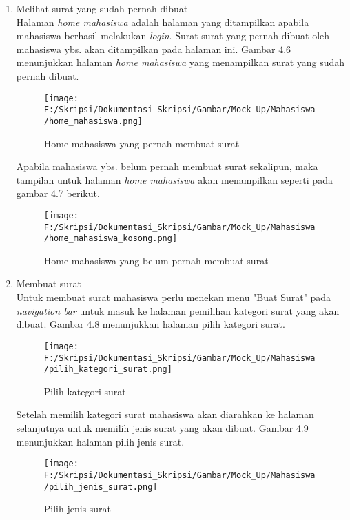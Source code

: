 \begin{enumerate}
	\item Melihat surat yang sudah pernah dibuat\\
	Halaman \textit{home mahasiswa} adalah halaman yang ditampilkan apabila mahasiswa berhasil melakukan \textit{login}. Surat-surat yang pernah dibuat oleh mahasiswa ybs. akan ditampilkan pada halaman ini. Gambar \hyperlink{home_mahasiswa_yang_pernah_membuat_surat}{4.6} menunjukkan halaman \textit{home mahasiswa} yang menampilkan surat yang sudah pernah dibuat.

	\begin{figure}[H]
	\centering
		\texttt{[image: F:/Skripsi/Dokumentasi\_Skripsi/Gambar/Mock\_Up/Mahasiswa/home\_mahasiswa.png]}
		\caption{Home mahasiswa yang pernah membuat surat}
		\label{fig:home_mahasiswa_yang_pernah_membuat_surat}
	\end{figure}
	
	Apabila mahasiswa ybs. belum pernah membuat surat sekalipun, maka tampilan untuk halaman \textit{home mahasiswa} akan menampilkan seperti pada gambar \hyperlink{home_mahasiswa_yang_belum_pernah_membuat_surat}{4.7} berikut.
	\begin{figure}[H]
	\centering
		\texttt{[image: F:/Skripsi/Dokumentasi\_Skripsi/Gambar/Mock\_Up/Mahasiswa/home\_mahasiswa\_kosong.png]}
		\caption{Home mahasiswa yang belum pernah membuat surat}
		\label{fig:home_mahasiswa_yang_belum_pernah_membuat_surat}
	\end{figure}
	
	\item Membuat surat\\
	Untuk membuat surat mahasiswa perlu menekan menu "Buat Surat" pada \textit{navigation bar} untuk masuk ke halaman pemilihan kategori surat yang akan dibuat. Gambar \hyperlink{pilih_kategori_surat}{4.8} menunjukkan halaman pilih kategori surat.
	\begin{figure}[H]
	\centering
		\texttt{[image: F:/Skripsi/Dokumentasi\_Skripsi/Gambar/Mock\_Up/Mahasiswa/pilih\_kategori\_surat.png]}
		\caption{Pilih kategori surat}
		\label{fig:pilih_kategori_surat}
	\end{figure}
	
	Setelah memilih kategori surat mahasiswa akan diarahkan ke halaman selanjutnya untuk memilih jenis surat yang akan dibuat. Gambar \hyperlink{pilih_jenis_surat}{4.9} menunjukkan halaman pilih jenis surat.
	\begin{figure}[H]
	\centering
		\texttt{[image: F:/Skripsi/Dokumentasi\_Skripsi/Gambar/Mock\_Up/Mahasiswa/pilih\_jenis\_surat.png]}
		\caption{Pilih jenis surat}
		\label{fig:pilih_jenis_surat}
	\end{figure}
	

\end{enumerate}

